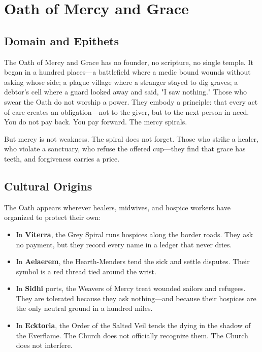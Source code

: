 \section{Oath of Mercy and Grace}

\subsection{Domain and Epithets}

The Oath of Mercy and Grace has no founder, no scripture, no single temple. It began in a hundred places—a battlefield where a medic bound wounds without asking whose side; a plague village where a stranger stayed to dig graves; a debtor's cell where a guard looked away and said, "I saw nothing." Those who swear the Oath do not worship a power. They embody a principle: that every act of care creates an obligation—not to the giver, but to the next person in need. You do not pay back. You pay forward. The mercy spirals.

But mercy is not weakness. The spiral does not forget. Those who strike a healer, who violate a sanctuary, who refuse the offered cup—they find that grace has teeth, and forgiveness carries a price.

\subsection{Cultural Origins}

The Oath appears wherever healers, midwives, and hospice workers have organized to protect their own:

\begin{itemize}
\item In \textbf{Viterra}, the Grey Spiral runs hospices along the border roads. They ask no payment, but they record every name in a ledger that never dries.
\item In \textbf{Aelaerem}, the Hearth-Menders tend the sick and settle disputes. Their symbol is a red thread tied around the wrist.
\item In \textbf{Sidhi} ports, the Weavers of Mercy treat wounded sailors and refugees. They are tolerated because they ask nothing—and because their hospices are the only neutral ground in a hundred miles.
\item In \textbf{Ecktoria}, the Order of the Salted Veil tends the dying in the shadow of the Everflame. The Church does not officially recognize them. The Church does not interfere.
\end{itemize}

